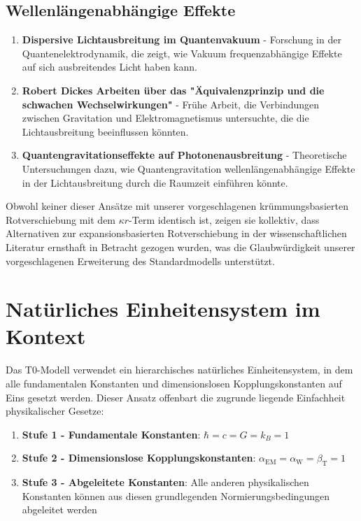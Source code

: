 \documentclass[12pt,a4paper]{article}
\newcommand{\alphaEM}{\alpha_{\text{EM}}}
\newcommand{\alphaW}{\alpha_{\text{W}}}
\newcommand{\betaT}{\beta_{\text{T}}}
\begin{document}
	\subsection{Wellenlängenabhängige Effekte}
	\label{subsec:wavelength_effects}
	
	\begin{enumerate}
		\item \textbf{Dispersive Lichtausbreitung im Quantenvakuum}\cite{drummond1980} - Forschung in der Quantenelektrodynamik, die zeigt, wie Vakuum frequenzabhängige Effekte auf sich ausbreitendes Licht haben kann.
		
		\item \textbf{Robert Dickes Arbeiten über das "Äquivalenzprinzip und die schwachen Wechselwirkungen"}\cite{dicke1957} - Frühe Arbeit, die Verbindungen zwischen Gravitation und Elektromagnetismus untersuchte, die die Lichtausbreitung beeinflussen könnten.
		
		\item \textbf{Quantengravitationseffekte auf Photonenausbreitung}\cite{amelino2009} - Theoretische Untersuchungen dazu, wie Quantengravitation wellenlängenabhängige Effekte in der Lichtausbreitung durch die Raumzeit einführen könnte.
	\end{enumerate}
	
	Obwohl keiner dieser Ansätze mit unserer vorgeschlagenen krümmungsbasierten Rotverschiebung mit dem $\kappa r$-Term identisch ist, zeigen sie kollektiv, dass Alternativen zur expansionsbasierten Rotverschiebung in der wissenschaftlichen Literatur ernsthaft in Betracht gezogen wurden, was die Glaubwürdigkeit unserer vorgeschlagenen Erweiterung des Standardmodells unterstützt.
	
	\section{Natürliches Einheitensystem im Kontext}
	\label{sec:natural_units_context}
	
	Das T0-Modell verwendet ein hierarchisches natürliches Einheitensystem, in dem alle fundamentalen Konstanten und dimensionslosen Kopplungskonstanten auf Eins gesetzt werden\cite{pascher_alphabeta_2025}. Dieser Ansatz offenbart die zugrunde liegende Einfachheit physikalischer Gesetze:
	
	\begin{enumerate}
		\item \textbf{Stufe 1 - Fundamentale Konstanten}: $\hbar = c = G = k_B = 1$\cite{planck1899}
		\item \textbf{Stufe 2 - Dimensionslose Kopplungskonstanten}: $\alphaEM = \alphaW = \betaT = 1$\cite{pascher_alpha_2025}
		\item \textbf{Stufe 3 - Abgeleitete Konstanten}: Alle anderen physikalischen Konstanten können aus diesen grundlegenden Normierungsbedingungen abgeleitet werden\cite{pascher_alphabeta_2025}
	\end{enumerate}
	
\end{document}
